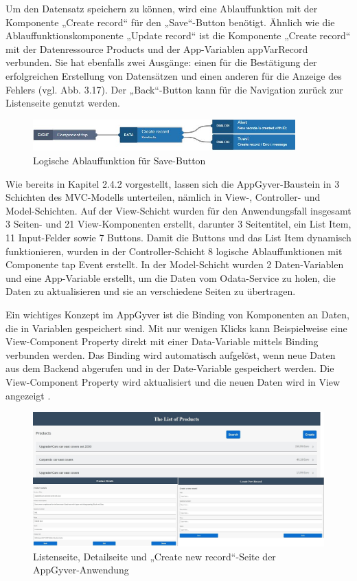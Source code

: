 Um den Datensatz speichern zu können, wird eine Ablauffunktion mit der Komponente „Create record“ für den „Save“-Button benötigt. Ähnlich wie die Ablauffunktionskomponente „Update record“ ist die Komponente „Create record“ mit der Datenressource Products und der App-Variablen appVarRecord verbunden. Sie hat ebenfalls zwei Ausgänge: einen für die Bestätigung der erfolgreichen Erstellung von Datensätzen und einen anderen für die Anzeige des Fehlers (vgl. Abb. 3.17). Der „Back“-Button kann für die Navigation zurück zur Listenseite genutzt werden.

\begin{figure}[htbp]
 \centering
 \includegraphics[width=0.9\textwidth]{Bilder/appgyver/3_17_logik_Save_Button.jpg}
 \caption{Logische Ablauffunktion für Save-Button}
\end{figure}

Wie bereits in Kapitel 2.4.2 vorgestellt, lassen sich die AppGyver-Baustein in 3 Schichten des MVC-Modells unterteilen, nämlich in View-, Controller- und Model-Schichten. Auf der View-Schicht wurden für den Anwendungsfall insgesamt 3 Seiten- und 21 View-Komponenten erstellt, darunter 3 Seitentitel, ein List Item, 11 Input-Felder sowie 7 Buttons. Damit die Buttons und das List Item dynamisch funktionieren, wurden in der Controller-Schicht 8 logische Ablauffunktionen mit Componente tap Event erstellt. In der Model-Schicht wurden 2 Daten-Variablen und eine App-Variable erstellt, um die Daten vom Odata-Service zu holen, die Daten zu aktualisieren und sie an verschiedene Seiten zu übertragen.

Ein wichtiges Konzept im AppGyver ist die Binding von Komponenten an Daten, die in Variablen gespeichert sind. Mit nur wenigen Klicks kann Beispielweise eine View-Component Property direkt mit einer Data-Variable mittels Binding verbunden werden. Das Binding wird automatisch aufgelöst, wenn neue Daten aus dem Backend abgerufen und in der Date-Variable gespeichert werden. Die View-Component Property wird aktualisiert und die neuen Daten wird in View angezeigt \cite{appg:bd}.

\begin{figure}[htbp]
 \centering
 \includegraphics[width=1.0\textwidth]{Bilder/appgyver/3_18_appgyver_list.jpg}
 \caption{Listenseite, Detailseite und „Create new record“-Seite der AppGyver-Anwendung}
\end{figure}

